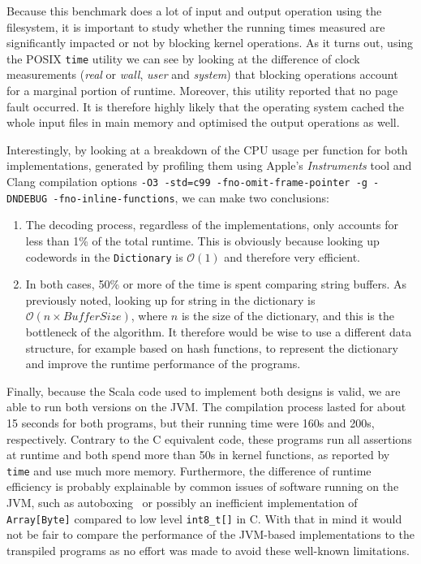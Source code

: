 \documentclass[a4paper,twoside]{article}
\newcommand{\Inline}[1]{\lstinline[basicstyle=\ttfamily]|#1|}
\newcommand{\InlineC}[1]{\lstinline[language=C99]|#1|}
\newcommand{\InlineS}[1]{\lstinline[language=Leon]|#1|}
\newcommand{\BigO}[1]{\mathcal{O}(#1)}
\begin{document}
Because this benchmark does a lot of input and output operation using the
filesystem, it is important to study whether the running times measured are
significantly impacted or not by blocking kernel operations. As it turns out,
using the POSIX \Inline{time} utility we can see by looking at the difference of
clock measurements (\emph{real} or \emph{wall}, \emph{user} and \emph{system})
that blocking operations account for a marginal portion of runtime. Moreover,
this utility reported that no page fault occurred. It is therefore highly likely
that the operating system cached the whole input files in main memory and
optimised the output operations as well.

Interestingly, by looking at a breakdown of the CPU usage per function for both
implementations, generated by profiling them using Apple's \emph{Instruments}
tool and Clang compilation options \Inline{-O3 -std=c99 -fno-omit-frame-pointer
-g -DNDEBUG -fno-inline-functions}, we can make two conclusions:

\begin{enumerate}

\item The decoding process, regardless of the implementations, only accounts for
less than 1\% of the total runtime. This is obviously because looking up
codewords in the \InlineS{Dictionary} is $\BigO{1}$ and therefore very
efficient.

\item In both cases, 50\% or more of the time is spent comparing string buffers.
As previously noted, looking up for string in the dictionary is $\BigO{n \times
BufferSize}$, where $n$ is the size of the dictionary, and this is the
bottleneck of the algorithm. It therefore would be wise to use a different data
structure, for example based on hash functions, to represent the dictionary and
improve the runtime performance of the programs.

\end{enumerate}

Finally, because the Scala code used to implement both designs is valid, we are
able to run both versions on the JVM. The compilation process lasted for about
15 seconds for both programs, but their running time were 160s and 200s,
respectively. Contrary to the C equivalent code, these programs run all
assertions at runtime and both spend more than 50s in kernel functions, as
reported by \Inline{time} and use much more memory. Furthermore, the difference
of runtime efficiency is probably explainable by common issues of software
running on the JVM, such as autoboxing~\cite{java8autoboxing} or possibly an
inefficient implementation of \InlineS{Array[Byte]} compared to low level
\InlineC{int8_t[]} in C. With that in mind it would not be fair to compare the
performance of the JVM-based implementations to the transpiled programs as no
effort was made to avoid these well-known limitations.
\end{document}
